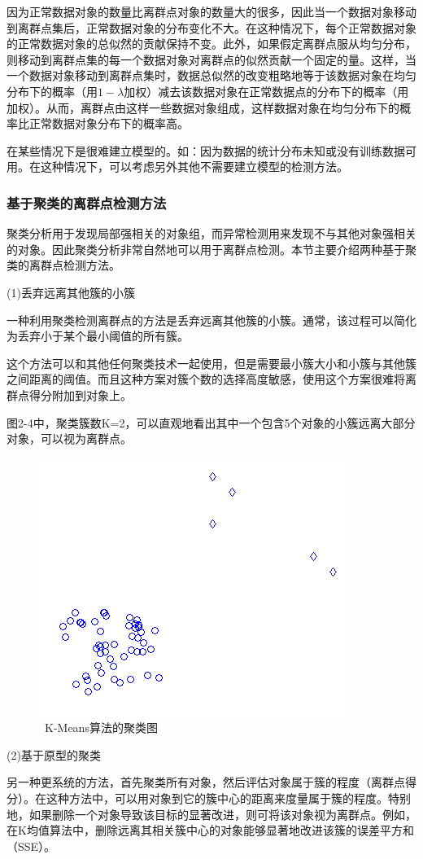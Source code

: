 因为正常数据对象的数量比离群点对象的数量大的很多，因此当一个数据对象移动到离群点集后，正常数据对象的分布变化不大。在这种情况下，每个正常数据对象的正常数据对象的总似然的贡献保持不变。此外，如果假定离群点服从均匀分布，则移动到离群点集的每一个数据对象对离群点的似然贡献一个固定的量。这样，当一个数据对象移动到离群点集时，数据总似然的改变粗略地等于该数据对象在均匀分布下的概率（用$1-\lambda$加权）减去该数据对象在正常数据点的分布下的概率（用加权）。从而，离群点由这样一些数据对象组成，这样数据对象在均匀分布下的概率比正常数据对象分布下的概率高。

在某些情况下是很难建立模型的。如：因为数据的统计分布未知或没有训练数据可用。在这种情况下，可以考虑另外其他不需要建立模型的检测方法。

\subsubsection{基于聚类的离群点检测方法}
聚类分析用于发现局部强相关的对象组，而异常检测用来发现不与其他对象强相关的对象。因此聚类分析非常自然地可以用于离群点检测。本节主要介绍两种基于聚类的离群点检测方法。



(1)丢弃远离其他簇的小簇

一种利用聚类检测离群点的方法是丢弃远离其他簇的小簇。通常，该过程可以简化为丢弃小于某个最小阈值的所有簇。

这个方法可以和其他任何聚类技术一起使用，但是需要最小簇大小和小簇与其他簇之间距离的阈值。而且这种方案对簇个数的选择高度敏感，使用这个方案很难将离群点得分附加到对象上。

图2-4中，聚类簇数K=2，可以直观地看出其中一个包含5个对象的小簇远离大部分对象，可以视为离群点。

\begin{figure}[thbp!]
\centering
\includegraphics[width=0.4\linewidth]{figure/2-7}
\caption{\ K-Means算法的聚类图}
\label{fig:2-7}
\end{figure}

(2)基于原型的聚类

另一种更系统的方法，首先聚类所有对象，然后评估对象属于簇的程度（离群点得分）。在这种方法中，可以用对象到它的簇中心的距离来度量属于簇的程度。特别地，如果删除一个对象导致该目标的显著改进，则可将该对象视为离群点。例如，在K均值算法中，删除远离其相关簇中心的对象能够显著地改进该簇的误差平方和（SSE）。

